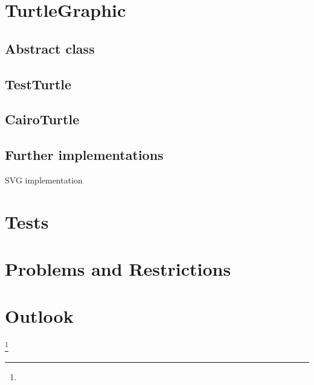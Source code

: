 \documentclass[english]{cpp-hmwk}
\begin{document}
\section{TurtleGraphic}
\subsection{Abstract class}
\subsection{TestTurtle}
\subsection{CairoTurtle}
\subsection{Further implementations}
SVG implementation
\section{Tests}
   \pagebreak
   \section{Problems and Restrictions}
   \section{Outlook}
   \footnote{}
\end{document}
